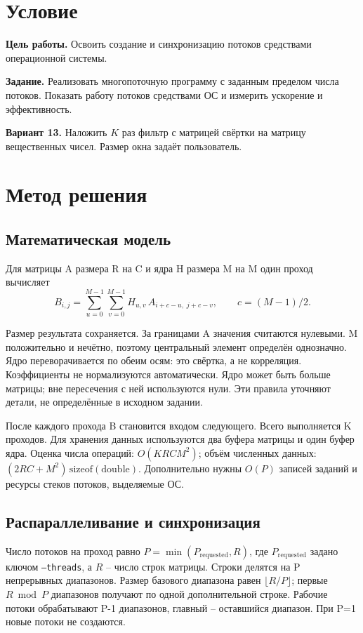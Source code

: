 \documentclass[12pt,a4paper]{article}
\begin{document}
\setlength{\emergencystretch}{3em}


\section{Условие}

\textbf{Цель работы.} Освоить создание и синхронизацию потоков средствами операционной системы.

\textbf{Задание.} Реализовать многопоточную программу с заданным пределом числа потоков. Показать работу потоков средствами ОС и измерить ускорение и эффективность.

\textbf{Вариант 13.} Наложить $K$ раз фильтр с матрицей свёртки на матрицу вещественных чисел. Размер окна задаёт пользователь.

\section{Метод решения}

\subsection{Математическая модель}

Для матрицы A размера R на C и ядра H размера M на M один проход вычисляет
\[
 B_{i,j}=\sum_{u=0}^{M-1}\sum_{v=0}^{M-1}
 H_{u,v}\,A_{i+c-u,\;j+c-v},\qquad c=(M-1)/2.
\]

Размер результата сохраняется. За границами A значения считаются нулевыми. M положительно и нечётно, поэтому центральный элемент определён однозначно. Ядро переворачивается по обеим осям: это свёртка, а не корреляция. Коэффициенты не нормализуются автоматически. Ядро может быть больше матрицы; вне пересечения с ней используются нули. Эти правила уточняют детали, не определённые в исходном задании.

После каждого прохода B становится входом следующего. Всего выполняется K проходов. Для хранения данных используются два буфера матрицы и один буфер ядра. Оценка числа операций: $O(KRCM^2)$; объём численных данных: $(2RC+M^2)\,\mathrm{sizeof(double)}$. Дополнительно нужны $O(P)$ записей заданий и ресурсы стеков потоков, выделяемые ОС.

\subsection{Распараллеливание и синхронизация}

Число потоков на проход равно $P=\min(P_{\mathrm{requested}},R)$, где $P_{\mathrm{requested}}$ задано ключом \texttt{--threads}, а $R$ -- число строк матрицы. Строки делятся на P непрерывных диапазонов. Размер базового диапазона равен $\lfloor R/P\rfloor$; первые $R\bmod P$ диапазонов получают по одной дополнительной строке. Рабочие потоки обрабатывают P-1 диапазонов, главный -- оставшийся диапазон. При P=1 новые потоки не создаются.
\end{document}
